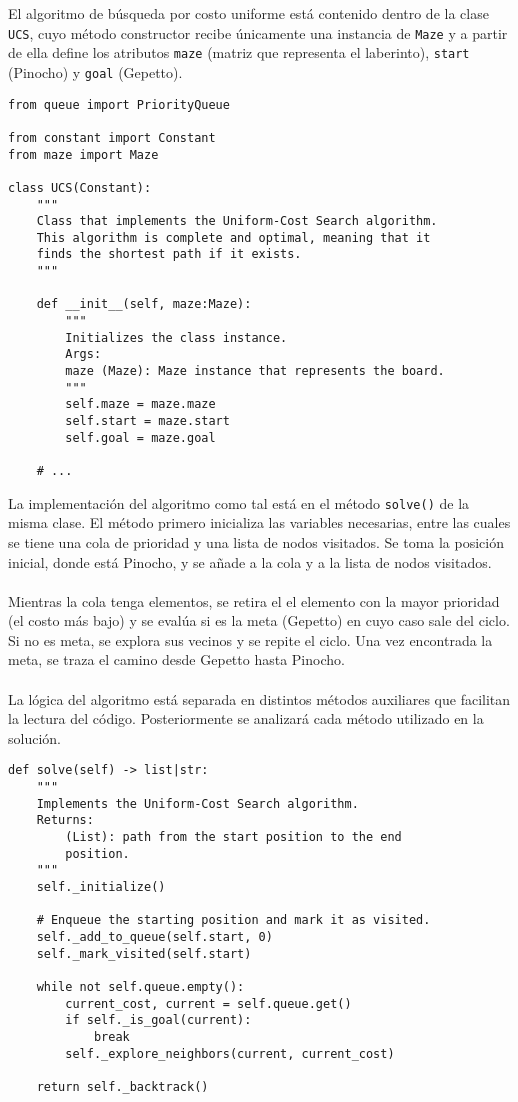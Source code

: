 El algoritmo de búsqueda por costo uniforme está contenido dentro de la clase \lstinline{UCS}, cuyo método constructor recibe únicamente una instancia de \lstinline{Maze} y a partir de ella define los atributos \lstinline{maze} (matriz que representa el laberinto), \lstinline{start} (Pinocho) y \lstinline{goal} (Gepetto).\\
\begin{lstlisting}
from queue import PriorityQueue

from constant import Constant
from maze import Maze
    
class UCS(Constant):
    """
    Class that implements the Uniform-Cost Search algorithm.
    This algorithm is complete and optimal, meaning that it
    finds the shortest path if it exists.
    """
    
    def __init__(self, maze:Maze):
        """
        Initializes the class instance.
        Args:
        maze (Maze): Maze instance that represents the board.
        """
        self.maze = maze.maze
        self.start = maze.start
        self.goal = maze.goal
    
    # ...
\end{lstlisting}
\clearpage
La implementación del algoritmo como tal está en el método \lstinline{solve()} de la misma clase. El método primero inicializa las variables necesarias, entre las cuales se tiene una cola de prioridad y una lista de nodos visitados. Se toma la posición inicial, donde está Pinocho, y se añade a la cola y a la lista de nodos visitados.
\\\\
Mientras la cola tenga elementos, se retira el el elemento con la mayor prioridad (el costo más bajo) y se evalúa si es la meta (Gepetto) en cuyo caso sale del ciclo. Si no es meta, se explora sus vecinos y se repite el ciclo. Una vez encontrada la meta, se traza el camino desde Gepetto hasta Pinocho.
\\\\
La lógica del algoritmo está separada en distintos métodos auxiliares que facilitan la lectura del código. Posteriormente se analizará cada método utilizado en la solución.\\
\begin{lstlisting}
def solve(self) -> list|str:
    """
    Implements the Uniform-Cost Search algorithm.
    Returns:
        (List): path from the start position to the end
        position.
    """
    self._initialize()

    # Enqueue the starting position and mark it as visited.
    self._add_to_queue(self.start, 0)
    self._mark_visited(self.start)

    while not self.queue.empty():
        current_cost, current = self.queue.get()
        if self._is_goal(current):
            break
        self._explore_neighbors(current, current_cost)

    return self._backtrack()
\end{lstlisting}
